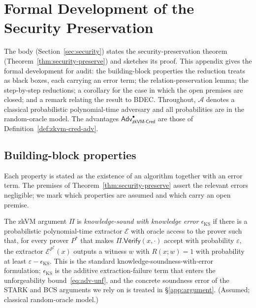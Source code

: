 \appendix
\section{Formal Development of the Security Preservation}\label{app:preservation}
The body (Section~\ref{sec:security}) states the security-preservation theorem (Theorem~\ref{thm:security-preserve}) and sketches its proof. This appendix gives the formal development for audit: the building-block properties the reduction treats as black boxes, each carrying an error term; the relation-preservation lemma; the step-by-step reductions; a corollary for the case in which the open premises are closed; and a remark relating the result to BDEC. Throughout, $\mathcal A$ denotes a classical probabilistic polynomial-time adversary and all probabilities are in the random-oracle model. The advantages $\mathsf{Adv}^{\bullet}_{\mathsf{zkVM\text{-}Cred}}$ are those of Definition~\ref{def:zkvm-cred-adv}.

\subsection{Building-block properties}\label{app:prsv-defs}
Each property is stated as the existence of an algorithm together with an error term. The premises of Theorem~\ref{thm:security-preserve} assert the relevant errors negligible; we mark which properties are assumed and which carry an open premise.

\begin{definition}\label{def:ks}
The zkVM argument $\Pi$ is \emph{knowledge-sound with knowledge error $\epsilon_{\mathrm{KS}}$} if there is a probabilistic polynomial-time extractor $\mathcal{E}$ with oracle access to the prover such that, for every prover $P^\ast$ that makes $\Pi.\mathsf{Verify}(x,\cdot)$ accept with probability $\varepsilon$, the extractor $\mathcal{E}^{P^\ast}(x)$ outputs a witness $w$ with $R(x;w)=1$ with probability at least $\varepsilon-\epsilon_{\mathrm{KS}}$. This is the standard knowledge-soundness-with-error formulation; $\epsilon_{\mathrm{KS}}$ is the additive extraction-failure term that enters the unforgeability bound~\eqref{eq:adv-unf}, and the concrete soundness error of the STARK and BCS arguments we rely on is treated in \S\ref{app:argument}. (Assumed; classical random-oracle model.)
\end{definition}

